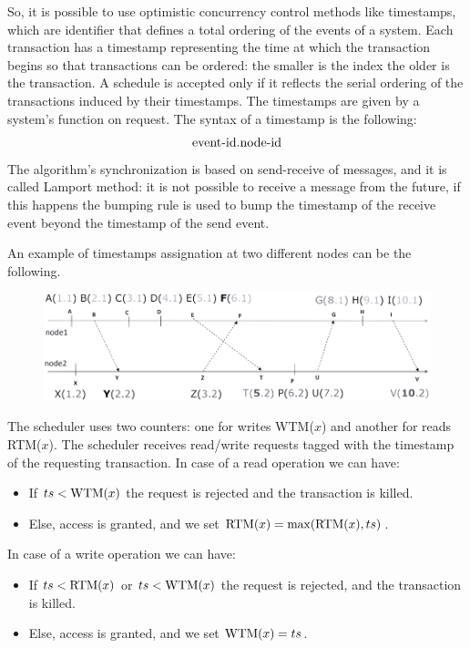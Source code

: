 \documentclass[12pt, a4paper]{report}
\begin{document}
    So, it is possible to use optimistic concurrency control methods like timestamps, which are identifier that defines a total ordering of the events of a system. Each transaction has a timestamp representing the time 
    at which the transaction begins so that transactions can be ordered: the smaller is the index the older is the transaction. A schedule is accepted only if it reflects the serial 
    ordering of the transactions induced by their timestamps. The timestamps are given by a system's function on request. The syntax of a timestamp is the following: 
    \[\textnormal{event-id}.\textnormal{node-id}\]
    The algorithm's synchronization is based on send-receive of messages, and it is called Lamport method: it is not possible to receive a message 
    from the future, if this happens the bumping rule is used to bump the timestamp of the receive event beyond the timestamp of the send event.     
    \begin{example}
        An example of timestamps assignation at two different nodes can be the following. 
        \begin{figure}[H]
            \centering
            \includegraphics[width=0.75\linewidth]{images/timestamps.png}
        \end{figure}
    \end{example}
    The scheduler uses two counters: one for writes WTM($x$) and another for reads RTM($x$). The scheduler receives read/write requests tagged with the timestamp of the 
    requesting transaction. In case of a read operation we can have: 
    \begin{itemize}
        \item If $ts<\textnormal{WTM}(x)$ the request is rejected and the transaction is killed. 
        \item Else, access is granted, and we set $\textnormal{RTM}(x)=\max(\textnormal{RTM}(x),ts)$. 
    \end{itemize}
    In case of a write operation we can have: 
    \begin{itemize}
        \item If $ts<\textnormal{RTM}(x)$ or $ts<\textnormal{WTM}(x)$ the request is rejected, and the  transaction is killed. 
        \item Else, access is granted, and we set $\textnormal{WTM}(x)=ts$. 
    \end{itemize}
\end{document}
